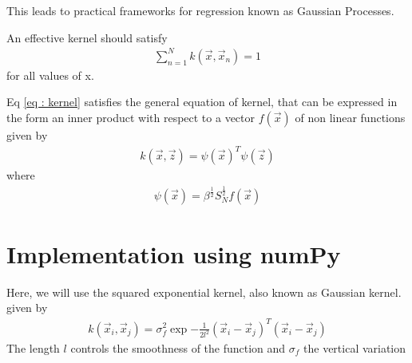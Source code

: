 \documentclass[journal,12pt,twocolumn]{IEEEtran}
\begin{document}
This leads to practical frameworks for regression known as Gaussian Processes.

An effective kernel should satisfy
\begin{align}
    \sum_{n=1}^{N} k(\vec{x},\vec{x}_{n}) = 1
\end{align}
for all values of x.

Eq \eqref{eq : kernel} satisfies the general equation of kernel, that can be expressed in the form an inner product with respect to a vector $f(\vec{x})$ of non linear functions given by
\begin{align}
      k(\vec{x},\vec{z}) = \psi(\vec{x})^{T}\psi(\vec{z})
\end{align}
where
\begin{align}
    \psi(\vec{x}) = \beta^{\frac{1}{2}}S_{N}^{\frac{1}{2}} f(\vec{x})
\end{align}
\section{Implementation using numPy}
Here, we will use the squared exponential kernel, also known as Gaussian kernel.
given by 
\begin{align}
    k(\vec{x}_{i},\vec{x}_{j}) = \sigma_{f}^{2} \exp{-\frac{1}{2l^2}(\vec{x}_i - \vec{x}_j)^{T}(\vec{x}_{i} - \vec{x}_{j})} \label{eq : kernel_1}
\end{align}
The length $l$ controls the smoothness of the function and $\sigma_{f}$ the vertical variation
\end{document}
